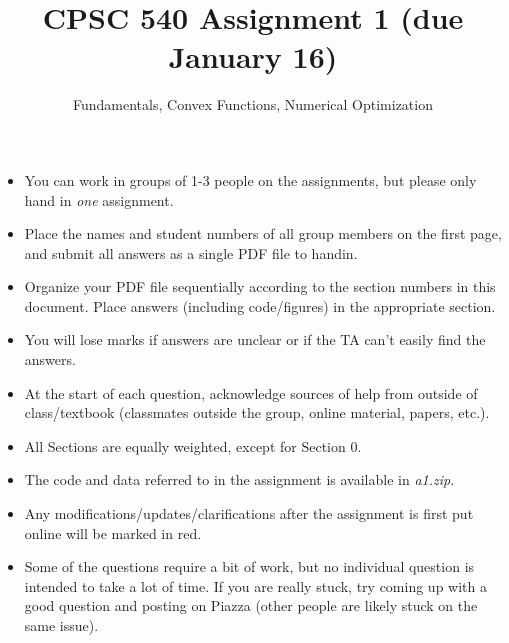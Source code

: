 \documentclass{article}
\begin{document}
\def\blu#1{{\color{blu}#1}}
\def\gre#1{{\color{gre}#1}}
\def\red#1{{\color{red}#1}}
\def\norm#1{\|#1\|}
\newcommand{\argmin}[1]{\mathop{\hbox{argmin}}_{#1}}
\newcommand{\argmax}[1]{\mathop{\hbox{argmax}}_{#1}}
\def\R{\mathbb{R}}
\newcommand{\fig}[2]{\texttt{[image: \#2]}}
\newcommand{\centerfig}[2]{\begin{center}\texttt{[image: \#2]}\end{center}}
\def\items#1{\begin{itemize}#1\end{itemize}}
\def\enum#1{\begin{enumerate}#1\end{enumerate}}
\def\answer#1{\iftoggle{answers}{\blu{Answer}:\\#1}}
\def\argmax{\mathop{\rm arg\,max}}
\def\argmin{\mathop{\rm arg\,min}}
\def\half{\frac 1 2}
\newcommand{\code}[1]{}



\title{CPSC 540 Assignment 1 (due January 16)}
\author{Fundamentals, Convex Functions, Numerical Optimization}
\date{}
\maketitle
\begin{itemize}
\item You can work in groups of 1-3 people on the assignments, but please only hand in \emph{one} assignment.
\item Place the names and student numbers of all group members on the first page, and \blu{submit all answers as a single PDF file to handin}. 
\item Organize your PDF file sequentially according to the section numbers in this document. Place answers (including code/figures) in the appropriate section.
\item You will lose marks if answers are unclear or if the TA can't easily find the answers.
\item At the start of each question, acknowledge sources of help from outside of class/textbook (classmates outside the group, online material, papers, etc.).
\item All Sections are equally weighted, except for Section 0.
\item The code and data referred to in the assignment is available in \emph{a1.zip}.
\item Any modifications/updates/clarifications after the assignment is first put online will be marked in \red{red}.
\item Some of the questions require a bit of work, but no individual question is intended to take a lot of time. If you are really stuck, try coming up with a good question and posting on Piazza (other people are likely stuck on the same issue).
\end{itemize}
\end{document}
